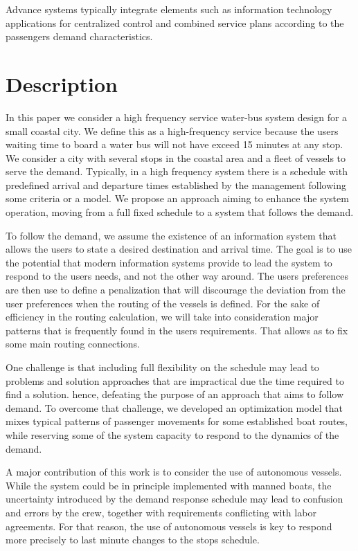 \documentclass[12pt]{elsarticle}
\begin{document}
Advance systems typically integrate elements such as information technology
applications for centralized control and combined service plans according to
the passengers demand characteristics.

\section{Description}

In this paper we consider a high frequency service water-bus system design
for a small coastal city. We define this as a high-frequency service because
the users waiting time to board a water bus will not have exceed 15 minutes
at any stop. We consider a city with several stops in the coastal area and a
fleet of vessels to serve the demand. Typically, in a high frequency system
there is a schedule with predefined arrival and departure times established
by the management following some criteria or a model. We propose an approach
aiming to enhance the system operation, moving from a full fixed schedule to
a system that follows the demand.

To follow the demand, we assume the existence of an information system that
allows the users to state a desired destination and arrival time. The goal is
to use the potential that modern information systems provide to lead the
system to respond to the users needs, and not the other way around. The users
preferences are then use to define a penalization that will discourage the
deviation from the user preferences when the routing of the vessels is
defined. For the sake of efficiency in the routing calculation, we will take
into consideration major patterns that is frequently found in the users
requirements. That allows as to fix some main routing connections.

One challenge is that including full flexibility on the schedule may lead to
problems and solution approaches that are impractical due the time required
to find a solution. hence, defeating the purpose of an approach that aims to
follow demand. To overcome that challenge, we developed an optimization model
that mixes typical patterns of passenger movements for some established boat
routes, while reserving some of the system capacity to respond to the
dynamics of the demand.

A major contribution of this work is to consider the use of autonomous
vessels. While the system could be in principle implemented with manned
boats, the uncertainty introduced by the demand response schedule may lead to
confusion and errors by the crew, together with requirements conflicting with
labor agreements. For that reason, the use of autonomous vessels is key to
respond more precisely to last minute changes to the stops schedule.
\end{document}

